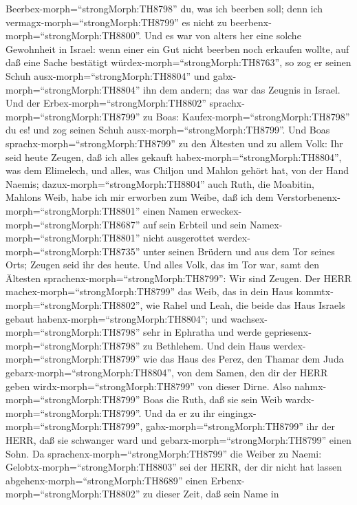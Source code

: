 Beerbex-morph=``strongMorph:TH8798'' du, was ich beerben soll; denn ich
vermagx-morph=``strongMorph:TH8799'' es nicht zu
beerbenx-morph=``strongMorph:TH8800''.  Und es war von
alters her eine solche Gewohnheit in Israel: wenn einer ein Gut nicht
beerben noch erkaufen wollte, auf daß eine Sache bestätigt
würdex-morph=``strongMorph:TH8763'', so zog er seinen Schuh
ausx-morph=``strongMorph:TH8804'' und gabx-morph=``strongMorph:TH8804''
ihn dem andern; das war das Zeugnis in Israel.  Und der
Erbex-morph=``strongMorph:TH8802'' sprachx-morph=``strongMorph:TH8799''
zu Boas: Kaufex-morph=``strongMorph:TH8798'' du es! und zog seinen Schuh
ausx-morph=``strongMorph:TH8799''.  Und Boas
sprachx-morph=``strongMorph:TH8799'' zu den Ältesten und zu allem Volk:
Ihr seid heute Zeugen, daß ich alles gekauft
habex-morph=``strongMorph:TH8804'', was dem Elimelech, und alles, was
Chiljon und Mahlon gehört hat, von der Hand Naemis; 
dazux-morph=``strongMorph:TH8804'' auch Ruth, die Moabitin, Mahlons
Weib, habe ich mir erworben zum Weibe, daß ich dem
Verstorbenenx-morph=``strongMorph:TH8801'' einen Namen
erweckex-morph=``strongMorph:TH8687'' auf sein Erbteil und sein
Namex-morph=``strongMorph:TH8801'' nicht ausgerottet
werdex-morph=``strongMorph:TH8735'' unter seinen Brüdern und aus dem Tor
seines Orts; Zeugen seid ihr des heute.  Und alles Volk,
das im Tor war, samt den Ältesten
sprachenx-morph=``strongMorph:TH8799'': Wir sind Zeugen. Der HERR
machex-morph=``strongMorph:TH8799'' das Weib, das in dein Haus
kommtx-morph=``strongMorph:TH8802'', wie Rahel und Leah, die beide das
Haus Israels gebaut habenx-morph=``strongMorph:TH8804''; und
wachsex-morph=``strongMorph:TH8798'' sehr in Ephratha und werde
gepriesenx-morph=``strongMorph:TH8798'' zu Bethlehem.  Und
dein Haus werdex-morph=``strongMorph:TH8799'' wie das Haus des Perez,
den Thamar dem Juda gebarx-morph=``strongMorph:TH8804'', von dem Samen,
den dir der HERR geben wirdx-morph=``strongMorph:TH8799'' von dieser
Dirne.  Also nahmx-morph=``strongMorph:TH8799'' Boas die
Ruth, daß sie sein Weib wardx-morph=``strongMorph:TH8799''. Und da er zu
ihr eingingx-morph=``strongMorph:TH8799'',
gabx-morph=``strongMorph:TH8799'' ihr der HERR, daß sie schwanger ward
und gebarx-morph=``strongMorph:TH8799'' einen Sohn.  Da
sprachenx-morph=``strongMorph:TH8799'' die Weiber zu Naemi:
Gelobtx-morph=``strongMorph:TH8803'' sei der HERR, der dir nicht hat
lassen abgehenx-morph=``strongMorph:TH8689'' einen
Erbenx-morph=``strongMorph:TH8802'' zu dieser Zeit, daß sein Name in
